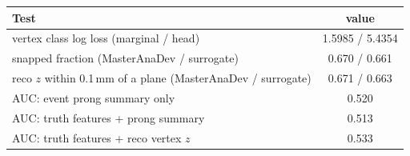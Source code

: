 \begin{tabular}{lc}
\toprule
Test & value \\
\midrule
vertex class log loss (marginal / head) & 1.5985 / 5.4354 \\
snapped fraction (MasterAnaDev / surrogate) & 0.670 / 0.661 \\
reco $z$ within 0.1\,mm of a plane (MasterAnaDev / surrogate) & 0.671 / 0.663 \\
\midrule
AUC: event prong summary only & 0.520 \\
AUC: truth features + prong summary & 0.513 \\
AUC: truth features + reco vertex $z$ & 0.533 \\
\bottomrule
\end{tabular}
